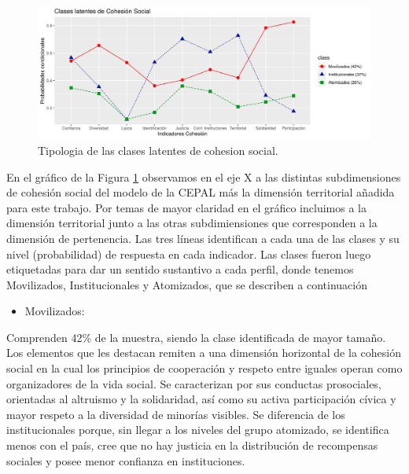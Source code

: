 \documentclass[
  12pt,
]{book}
\providecommand{\tightlist}{%
  \setlength{\itemsep}{0pt}\setlength{\parskip}{0pt}}
\begin{document}
\begin{figure}[H]

{\centering \includegraphics[width=1\linewidth,height=1\textheight]{output/graphs/lca3} 

}

\caption{Tipologia de las clases latentes de cohesion social.}\label{fig:clases-latentes}
\end{figure}

En el gráfico de la Figura \ref{fig:clases-latentes} observamos en el eje X a las distintas subdimensiones de cohesión social del modelo de la CEPAL más la dimensión territorial añadida para este trabajo. Por temas de mayor claridad en el gráfico incluimos a la dimensión territorial junto a las otras subdimiensiones que corresponden a la dimensión de pertenencia. Las tres líneas identifican a cada una de las clases y su nivel (probabilidad) de respuesta en cada indicador. Las clases fueron luego etiquetadas para dar un sentido sustantivo a cada perfil, donde tenemos Movilizados, Institucionales y Atomizados, que se describen a continuación

\begin{itemize}
\tightlist
\item
  Movilizados:
\end{itemize}

Comprenden 42\% de la muestra, siendo la clase identificada de mayor tamaño. Los elementos que les destacan remiten a una dimensión horizontal de la cohesión social en la cual los principios de cooperación y respeto entre iguales operan como organizadores de la vida social. Se caracterizan por sus conductas prosociales, orientadas al altruismo y la solidaridad, así como su activa participación cívica y mayor respeto a la diversidad de minorías visibles. Se diferencia de los institucionales porque, sin llegar a los niveles del grupo atomizado, se identifica menos con el país, cree que no hay justicia en la distribución de recompensas sociales y posee menor confianza en instituciones.
\end{document}

